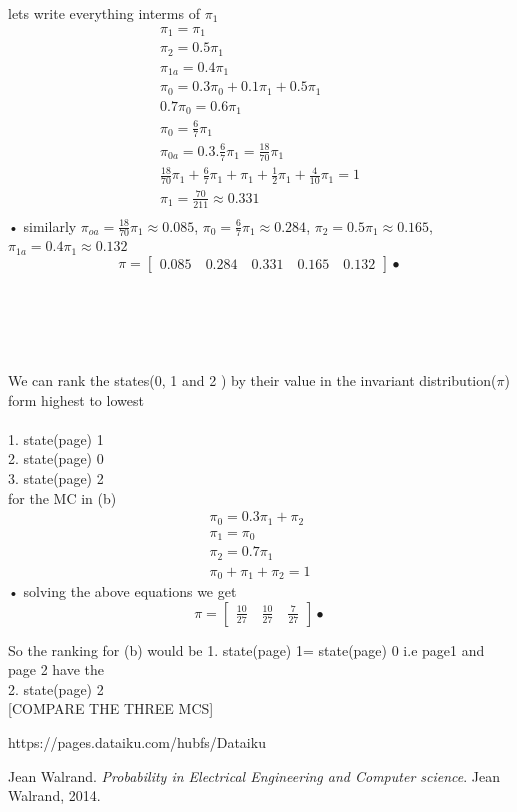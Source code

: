 \documentclass[a4paper,11pt]{report}
\begin{document}
lets write everything interms of $\pi_1$\\

\begin{eqnarray}
\pi_1=\pi_1\\
\pi_2=0.5\pi_1\\
\pi_{1a}=0.4\pi_1\\
\pi_0 = 0.3\pi_0 + 0.1\pi_1 + 0.5\pi_1\\
0.7\pi_0=0.6\pi_1\\
\pi_0 = \frac{6}{7}\pi_1\\
\pi_{0a} = 0.3.\frac{6}{7}\pi_1=\frac{18}{70}\pi_1\\
\frac{18}{70}\pi_1+\frac{6}{7}\pi_1+\pi_1+\frac{1}{2}\pi_1+\frac{4}{10}\pi_1 = 1\\
\pi_1 = \frac{70}{211}\approx 0.331\\
\end{eqnarray}•
similarly  $\pi_{oa} = \frac{18}{70}\pi_1\approx0.085$, $\pi_0=\frac{6}{7}\pi_1\approx0.284$, $\pi_2=0.5\pi_1\approx0.165$, $\pi_{1a}=0.4\pi_1\approx0.132$
$$
\pi = \begin{bmatrix}
0.085 \quad 0.284 \quad 0.331 \quad 0.165 \quad 0.132    
\end{bmatrix}•
$$
\\\\\\\\\\We can rank the states(0, 1  and 2 ) by their value in the invariant distribution($\pi$) form highest to lowest\\\\
1. state(page) 1\\
2. state(page) 0\\
3. state(page) 2\\


for the MC in (b)
\begin{eqnarray}
\pi_0  = 0.3\pi_1 + \pi_2\\
\pi_1  = \pi_0\\
\pi_2  = 0.7\pi_1\\
\pi_0+\pi_1+\pi_2=1
\end{eqnarray}•
solving the above equations we get\\
$$
\pi = \begin{bmatrix}
\frac{10}{27} \quad \frac{10}{27} \quad \frac{7}{27}    
\end{bmatrix}•
$$

So the ranking for (b) would be 
1. state(page) 1= state(page) 0 i.e page1 and page 2 have the \\
2. state(page) 2\\

[COMPARE THE THREE MCS]
\newpage


	
\begin{thebibliography}{9}
https://pages.dataiku.com/hubfs/Dataiku%

Jean Walrand. 
\textit{Probability in Electrical Engineering and Computer science}. 
Jean Walrand, 2014.
\end{thebibliography}
\end{document}

